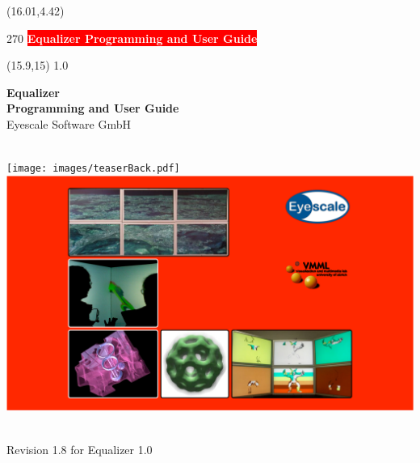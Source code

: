 \documentclass[10pt]{scrartcl}
\newcommand{\boxwidth}{5in}
\newcommand{\spacewidth}{604pt}
\newcommand{\spinewidth}{19.62pt}
\begin{document}
\thispagestyle{empty}

\begin{textblock}{}(16.01,4.42)
  \begin{rotate}{270}
    \setlength{\fboxsep}{5pt} 
    \colorbox{red}{\textsf{\bfseries\LARGE\textcolor{white}{{\hspace{12pt}Equalizer
            Programming and User Guide\hspace{12pt}}}}}
  \end{rotate}
\end{textblock}

\begin{textblock}{}(15.9,15)
  {\Large 1.0}
\end{textblock}

\vfill
\parbox[t]{\spacewidth}{\hfill}
\parbox[t]{\boxwidth}{
  \center
  \textsf{\textbf{\huge Equalizer\\Programming and User Guide}}\\[\bigskipamount]
  {\Large Eyescale Software GmbH}
}\\
\vfill
\hspace{-128pt}
  \texttt{[image: images/teaserBack.pdf]}
  \hspace{\spinewidth}
  \includegraphics[width=604pt]{images/teaser.pdf}
\\
\vfill
\parbox[t]{\spacewidth}{\hfill}
\parbox[t]{\boxwidth}{ \\\vspace{1cm}
  {\Large Revision 1.8 for Equalizer 1.0}\\[\medskipamount]
}
\end{document}
